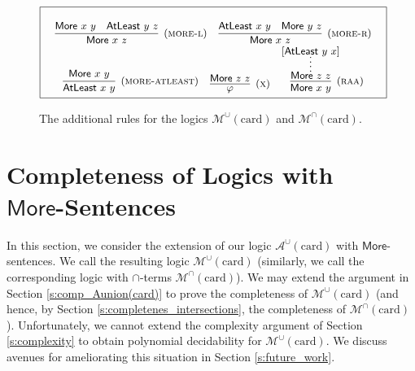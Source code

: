\documentclass[letterpaper]{article} %
\theoremstyle{definition}
\newcommand{\set}[1]{\{ #1 \}}
\newcommand{\proves}{\vdash}
\newcommand{\Aunion}{\mathscr{A}^{\cup}}
\newcommand{\Munion}{\mathscr{M}^{\cup}}
\newcommand{\Minter}{\mathscr{M}^{\cap}}
\newcommand{\proverule}{\textsc}
\newcommand{\morel}{\proverule{more-l}}
\newcommand{\morer}{\proverule{more-r}}
\newcommand{\moreatleast}{\proverule{more-atleast}}
\newcommand{\x}{\proverule{x}}
\newcommand{\raa}{\proverule{raa}}
\newcommand{\Ptime}{\textsc{PTime}}
\newcommand{\Atleast}[2]{\mathsf{AtLeast}\,\,#1\,\,#2}
\newcommand{\More}[2]{\mathsf{More}\,\,#1\,\,#2}
\newcommand{\MoreNoArgs}{\mathsf{More}}
\newcommand{\card}{\mathrm{card}}
\begin{document}

\begin{figure*}[ht!]
\begin{equation*}
\boxed{
\small
\begin{array}{c}
\begin{array}{ccc}
\\ 
\infer[(\morel)]
    {\More{x}{z}}
    {\More{x}{y} & \Atleast{y}{z}} 
&
\infer[(\morer)]
    {\More{x}{z}}
    {\Atleast{x}{y} & \More{y}{z}}
\end{array}
\\%
\begin{array}{ccc}
\infer[(\moreatleast)]
    {\Atleast{x}{y}}
    {\More{x}{y}}
&
\infer[(\x)]
    {\varphi}
    {\More{z}{z}}
&
\infer[(\raa)]
     {\More{x}{y}}
     {\inferLineSkip=0pt
     \infer*
        {\More{z}{z}}
        {[\Atleast{y}{x}]}}
\end{array}
\\
\end{array}
}
\end{equation*}
\caption{The additional rules for the logics $\Munion(\card)$ and $\Minter(\card)$.
\label{fig-more-rules}}
\end{figure*}

\section{Completeness of Logics with \\$\MoreNoArgs$-Sentences}\label{s:completeness-more}

In this section, we consider the extension of our logic $\Aunion(\card)$ with $\MoreNoArgs$-sentences.  We call the resulting logic $\Munion(\card)$ (similarly, we call the corresponding logic with $\cap$-terms $\Minter(\card)$).  We may extend the argument in Section \ref{s:comp_Aunion(card)} to prove the completeness of $\Munion(\card)$ (and hence, by Section \ref{s:completenes_intersections}, the completeness of $\Minter(\card)$).  Unfortunately, we cannot extend the complexity argument of Section \ref{s:complexity} to obtain polynomial decidability for $\Munion(\card)$.  We discuss avenues for ameliorating this situation in Section \ref{s:future_work}.
\end{document}
